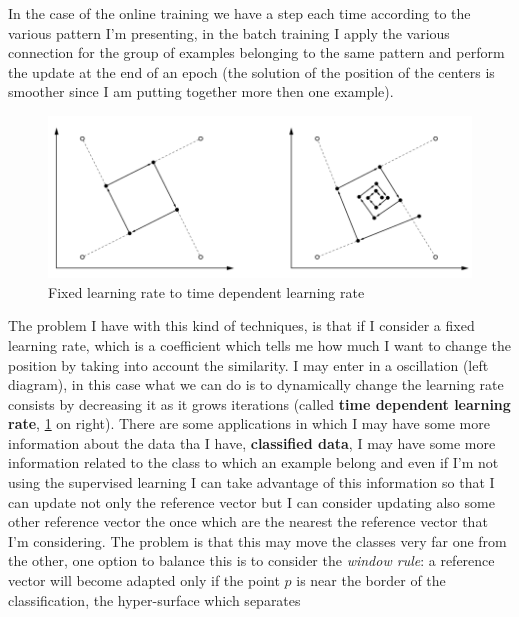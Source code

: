 \documentclass{article}
\begin{document}
In the case of the online training we have a step each time according to the various
pattern I'm presenting, in the batch training I apply the various
connection for the group of examples belonging to the same pattern and perform the update at the end
of an epoch (the solution of the position of the centers is smoother
since I am putting together more then one example).
\begin{figure}[H]
    \centering
    \includegraphics[scale=0.5]{images/time_dep_lm.png}
    \caption{Fixed learning rate to time dependent learning rate}
    \label{fig:tdln}
\end{figure}
The problem I have with this kind of techniques, is that if I consider a fixed learning rate,
which is a coefficient which tells me how much I want to change the position by taking
into account the similarity.
\newline\newline
I may enter in a oscillation (left diagram), in this case
what we can do is to dynamically change the learning rate consists by decreasing it
as it grows iterations (called \textbf{time dependent learning rate}, \ref{fig:tdln} on right).
\newline\newline
There are some applications in which I may have some more information
about the data tha I have, \textbf{classified data}, I may have some more information
related to the class to which an example belong and even
if I'm not using the supervised learning I can take advantage of this information
so that I can update not only the reference vector but I can consider updating also
some other reference vector the once which are the nearest the reference vector
that I'm considering.
\newline\newline
The problem is that this may move the classes very far one from the other,
one option to balance this is to consider the \textit{window rule}: a reference vector will become adapted
only if the point $p$ is near the border of the classification, the hyper-surface which separates
\end{document}
